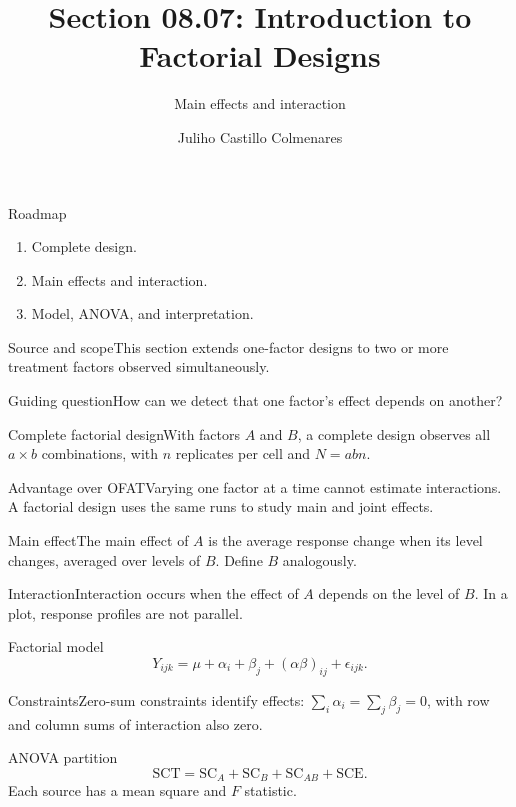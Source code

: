 \documentclass[10pt,aspectratio=169]{beamer}
\title[Factorial designs]{Section 08.07: Introduction to Factorial Designs}\subtitle{Main effects and interaction}\author[J. Castillo Colmenares]{Juliho Castillo Colmenares}\institute{Tecnológico de Monterrey}\date{}
\begin{document}
\begin{frame}[plain]\titlepage\end{frame}
\begin{frame}{Roadmap}\small\begin{enumerate}\item Complete design.\item Main effects and interaction.\item Model, ANOVA, and interpretation.\end{enumerate}\end{frame}
\begin{frame}{Source and scope}\small This section extends one-factor designs to two or more treatment factors observed simultaneously.\begin{block}{Guiding question}How can we detect that one factor's effect depends on another?\end{block}\end{frame}
\begin{frame}{Complete factorial design}\small With factors $A$ and $B$, a complete design observes all $a\times b$ combinations, with $n$ replicates per cell and $N=abn$.\end{frame}
\begin{frame}{Advantage over OFAT}\small Varying one factor at a time cannot estimate interactions. A factorial design uses the same runs to study main and joint effects.\end{frame}
\begin{frame}{Main effect}\small The main effect of $A$ is the average response change when its level changes, averaged over levels of $B$. Define $B$ analogously.\end{frame}
\begin{frame}{Interaction}\small Interaction occurs when the effect of $A$ depends on the level of $B$. In a plot, response profiles are not parallel.\end{frame}
\begin{frame}{Factorial model}\small\[Y_{ijk}=\mu+\alpha_i+\beta_j+(\alpha\beta)_{ij}+\epsilon_{ijk}.\]\end{frame}
\begin{frame}{Constraints}\small Zero-sum constraints identify effects: $\sum_i\alpha_i=\sum_j\beta_j=0$, with row and column sums of interaction also zero.\end{frame}
\begin{frame}{ANOVA partition}\small\[\mathrm{SCT}=\mathrm{SC}_A+\mathrm{SC}_B+\mathrm{SC}_{AB}+\mathrm{SCE}.\]Each source has a mean square and $F$ statistic.\end{frame}
\end{document}
